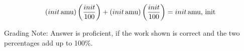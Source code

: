 \begin{solution}
\[
(init\,\text{amu})\left(\frac{init}{100}\right)+(init\,\text{amu})\left(\frac{init}{100}\right)=init\,\text{amu, init}
\]

\vspace{2\baselineskip}
  \ifgradingnotes
 Grading Note: Answer is proficient, if the work shown is correct and the two percentages add up to 100\%. 
 \fi
\end{solution}


